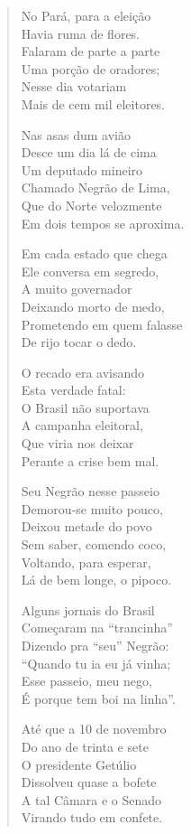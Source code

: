 \begin{verse}
No Pará, para a eleição\\
Havia ruma de flores.\\
Falaram de parte a parte\\
Uma porção de oradores;\\
Nesse dia votariam\\
Mais de cem mil eleitores.
\pagebreak

Nas asas dum avião\\
Desce um dia lá de cima\\
Um deputado mineiro\\
Chamado Negrão de Lima,\\
Que do Norte velozmente\\
Em dois tempos se aproxima.

Em cada estado que chega\\
Ele conversa em segredo,\\
A muito governador\\
Deixando morto de medo,\\
Prometendo em quem falasse\\
De rijo tocar o dedo.

O recado era avisando\\
Esta verdade fatal:\\
O Brasil não suportava\\
A campanha eleitoral,\\
Que viria nos deixar\\
Perante a crise bem mal.

Seu Negrão nesse passeio\\
Demorou-se muito pouco,\\
Deixou metade do povo\\
Sem saber, comendo coco,\\
Voltando, para esperar,\\
Lá de bem longe, o pipoco.
\pagebreak

Alguns jornais do Brasil\\
Começaram na “trancinha”\\
Dizendo pra “seu” Negrão:\\
“Quando tu ia eu já vinha;\\
Esse passeio, meu nego,\\
É porque tem boi na linha”.

Até que a 10 de novembro\\
Do ano de trinta e sete\\
O presidente Getúlio\\
Dissolveu quase a bofete\\
A tal Câmara e o Senado\\
Virando tudo em confete.


\end{verse}
